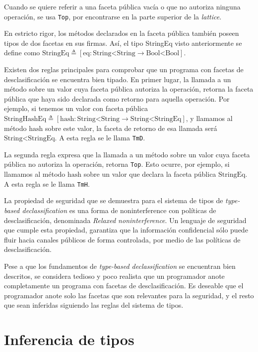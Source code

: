 Cuando se quiere referir a una faceta pública vacía o que no autoriza ninguna operación, se usa \texttt{Top}, por encontrarse en la parte superior de la \textit{lattice}.

En estricto rigor, los métodos declarados en la faceta pública también poseen tipos de dos facetas en sus firmas. Así, el tipo StringEq visto anteriormente se define como  $\text{StringEq} \triangleq [\text{eq} : \text{String<String} \rightarrow \text{Bool<Bool}]$.

Existen dos reglas principales para comprobar que un programa con facetas de desclasificación se encuentra bien tipado. En primer lugar, la llamada a un método sobre un valor cuya faceta pública autoriza la operación, retorna la faceta pública que haya sido declarada como retorno para aquella operación. Por ejemplo, si tenemos un valor con faceta pública $\text{StringHashEq} \triangleq [\text{hash} : \text{String<String} \rightarrow \text{String<StringEq}]$, y llamamos al método $\text{hash}$ sobre este valor, la faceta de retorno de esa llamada será $\text{String<StringEq}$. A esta regla se le llama \texttt{TmD}.

La segunda regla expresa que la llamada a un método sobre un valor cuya faceta pública no autoriza la operación, retorna \texttt{Top}. Esto ocurre, por ejemplo, si llamamos al método $\text{hash}$ sobre un valor que declara la faceta pública $\text{StringEq}$. A esta regla se le llama \texttt{TmH}.

La propiedad de seguridad que se demuestra para el sistema de tipos de \textit{type-based declassification} es una forma de noninterference con políticas de desclasificación, denominada \textit{Relaxed noninterference}. Un lenguaje de seguridad que cumple esta propiedad, garantiza que la información confidencial sólo puede fluir hacia canales públicos de forma controlada, por medio de las políticas de desclasificación.

Pese a que los fundamentos de \textit{type-based declassification} se encuentran bien descritos, se considera tedioso y poco realista que un programador anote completamente un programa con facetas de desclasificación. Es deseable que el programador anote solo las facetas que son relevantes para la seguridad, y el resto que sean inferidas siguiendo las reglas del sistema de tipos.

\section{Inferencia de tipos}
